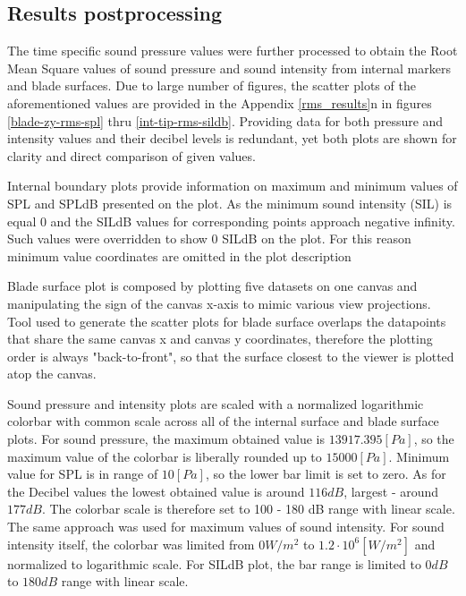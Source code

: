 \subsection{Results postprocessing} \label{rms_res_prep}
The time specific sound pressure values were further processed to obtain the Root Mean Square values of sound pressure and sound intensity from internal markers and blade surfaces. Due to large number of figures, the scatter plots of the aforementioned values are provided in the Appendix \ref{rms_results}n in figures \ref{blade-zy-rms-spl} thru \ref{int-tip-rms-sildb}. Providing data for both pressure and intensity values and their decibel levels is redundant, yet both plots are shown for clarity and direct comparison of given values. 

Internal boundary plots provide information on maximum and minimum values of SPL and SPLdB presented on the plot. As the minimum sound intensity (SIL) is equal 0 and the SILdB values for corresponding points approach negative infinity. Such values were overridden to show 0 SILdB on the plot.    For this reason minimum value coordinates are omitted in the plot description 

Blade surface plot is composed by plotting five datasets on one canvas and manipulating the sign of the canvas x-axis to mimic various view projections. Tool used to generate the scatter plots for blade surface overlaps the datapoints that share the same canvas x and canvas y coordinates, therefore the plotting order is always "back-to-front", so that the surface closest to the viewer is plotted atop the canvas.

Sound pressure and intensity plots are scaled with a normalized logarithmic colorbar with common scale across all of the internal surface and blade surface plots. For sound pressure, the maximum obtained value is $13917.395 [Pa]$, so the maximum value of the colorbar is liberally rounded up to $15000 [Pa]$. Minimum value for SPL is in range of $10 [Pa]$, so the lower bar limit is set to zero. As for the Decibel values the lowest obtained value is around $116 dB$, largest - around $177 dB$. The colorbar scale is therefore set to 100 - 180 dB range with linear scale. The same approach was used for maximum values of sound intensity. For sound intensity itself, the colorbar was limited from $0 W/m^2$ to $1.2 \cdot 10^6 [W/m^2]$ and normalized to logarithmic scale. For SILdB plot, the bar range is limited to $0 dB$ to $180 dB$ range with linear scale. %

